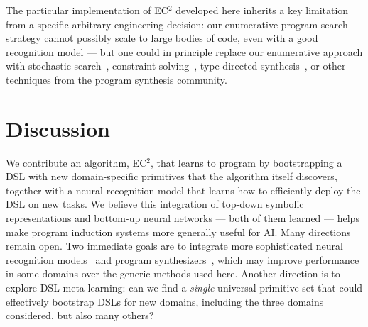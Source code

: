 \documentclass{article}
\newcommand{\systemEnding}{\textsc{EC$^2$}}
\begin{document}
 The particular implementation of EC$^2$ developed here
 inherits a key limitation from a specific arbitrary engineering decision:
 our enumerative program search strategy cannot possibly
 scale to large bodies of code, even with a good recognition model --- but one could in principle replace
 our enumerative approach with stochastic search~\cite{schkufza2013stochastic,DBLP:books/daglib/0070933},
 constraint solving~\cite{solar2008program}, type-directed synthesis~\cite{polikarpova2016program},
 or other techniques from the program synthesis community.
 
 
 
 

 \section{Discussion}


We contribute an algorithm, \systemEnding, that learns to program by
bootstrapping a DSL with new domain-specific primitives that the algorithm
itself discovers, together with a neural recognition model that learns how to
efficiently deploy the DSL on new tasks. We believe this integration of top-down
symbolic representations and bottom-up neural networks --- both of them learned
--- helps make program induction systems more generally useful for AI. Many
directions remain open.
Two immediate goals are to integrate more sophisticated neural recognition
models~\cite{devlin2017robustfill} and program
synthesizers~\cite{solar2008program}, which may improve performance in some
domains over the generic methods used here.
Another direction is to explore DSL meta-learning: can we find a
\emph{single} universal primitive set that could effectively bootstrap DSLs for
new domains, including the three domains considered,  but also many others?
\end{document}
